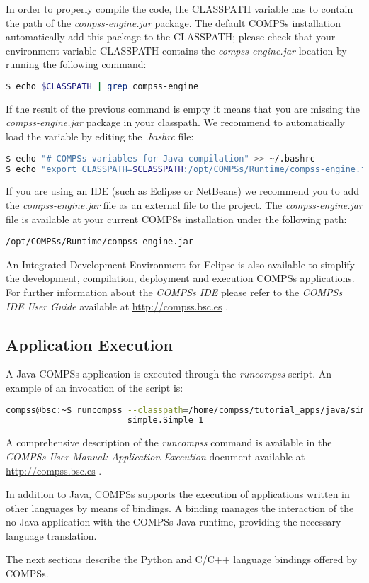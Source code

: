 In order to properly compile the code, the CLASSPATH variable has to contain the path of the \textit{compss-engine.jar} package. The default COMPSs
installation automatically add this package to the CLASSPATH; please check that your environment variable CLASSPATH contains the \textit{compss-engine.jar} location by running the following command:
\begin{lstlisting}[language=bash]
$ echo $CLASSPATH | grep compss-engine
\end{lstlisting}
If the result of the previous command is empty it means that you are missing the \textit{compss-engine.jar} package in your classpath. 
We recommend to automatically load the variable by editing the \textit{.bashrc} file:
\begin{lstlisting}[language=bash]
$ echo "# COMPSs variables for Java compilation" >> ~/.bashrc
$ echo "export CLASSPATH=$CLASSPATH:/opt/COMPSs/Runtime/compss-engine.jar" >> ~/.bashrc
\end{lstlisting}

If you are using an IDE (such as Eclipse or NetBeans) we recommend you to add the \textit{compss-engine.jar} file as an external file 
to the project. The \textit{compss-engine.jar} file is available at your current COMPSs installation under the following path:

\verb|/opt/COMPSs/Runtime/compss-engine.jar|


An Integrated Development Environment for Eclipse is also available to simplify the development, compilation,
deployment and execution COMPSs applications. For further information about the \textit{COMPSs IDE} please refer to the \textit{COMPSs IDE
User Guide} available at \url{http://compss.bsc.es} .


\subsection{Application Execution}
A Java COMPSs application is executed through the \textit{runcompss} script. An example of an invocation of the script is:

\begin{lstlisting}[language=bash]
compss@bsc:~$ runcompss --classpath=/home/compss/tutorial_apps/java/simple/jar/simple.jar 
                        simple.Simple 1
\end{lstlisting}

A comprehensive description of the \textit{runcompss} command is available in the \textit{COMPSs User Manual: Application
Execution} document available at \url{http://compss.bsc.es} . 
\newline
~ \newline

In addition to Java, COMPSs supports the execution of applications written in other languages by 
means of bindings. A binding manages the interaction of the no-Java application with the COMPSs 
Java runtime, providing the necessary language translation.

The next sections describe the Python and C/C++ language bindings offered by COMPSs.
